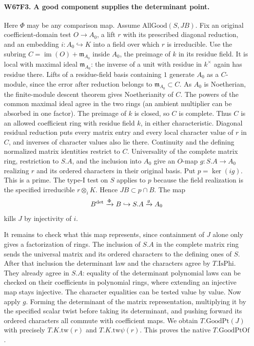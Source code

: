 \paragraph{W67F3. A good component supplies the determinant point.}
Here $\Phi$ may be any comparison map. Assume
$\mathrm{AllGood}(S,JB)$. Fix an original coefficient-domain
test $O\to A_0$, a lift $r$ with its prescribed diagonal reduction,
and an embedding $i:A_0\hookrightarrow K$ into a field over which
$r$ is irreducible. Use the subring
$C=\operatorname{im}(O)+\mathfrak m_{A_0}$ inside $A_0$, the
preimage of $k$ in its residue field. It is local with maximal ideal
$\mathfrak m_{A_0}$: the inverse of a unit with residue in
$k^\times$ again has residue there. Lifts of a residue-field basis
containing $1$ generate $A_0$ as a $C$-module, since the error
after reduction belongs to $\mathfrak m_{A_0}\subset C$.
As $A_0$ is Noetherian, the finite-module descent theorem gives
Noetherianity of $C$. The powers of the common maximal ideal agree
in the two rings (an ambient multiplier can be absorbed in one
factor). The preimage of $k$ is closed, so $C$ is complete.
Thus $C$ is an allowed coefficient ring with residue field $k$,
in either characteristic. Diagonal residual reduction puts every
matrix entry and every local character value of $r$ in $C$,
and inverses of character values also lie there. Continuity and
the defining normalized matrix identities restrict to $C$.
Universality of the complete matrix ring, restriction to $S.A$,
and the inclusion into $A_0$ give an $O$-map $g:S.A\to A_0$
realizing $r$ and its ordered characters in their original basis.
Put $p=\ker(i g)$. This is a prime. The type-I test
on $S$ applies to $p$ because the field realization is the
specified irreducible $r\otimes_i K$. Hence $JB\subset p\cap B$.
The map
\[
                B^{\rm det}\xrightarrow{\Phi}B
                          \hookrightarrow S.A\xrightarrow{g}A_0
\]
kills $J$ by injectivity of $i$.

It remains to check what this map represents, since containment
of $J$ alone only gives a factorization of rings. The inclusion
of $S.A$ in the complete matrix ring sends the universal matrix
and its ordered characters to the defining ones of $S$.
After that inclusion the determinant law and the characters agree
by $T.\mathrm{IsPhi}$. They already agree in $S.A$: equality of
the determinant polynomial laws can be checked on their coefficients
in polynomial rings, where extending an injective map stays
injective. The character equalities can be tested value by value.
Now apply $g$. Forming the determinant of the matrix representation,
multiplying it by the specified scalar twist before taking its
determinant, and pushing forward its ordered characters all commute
with coefficient maps. We obtain $T.\mathrm{GoodPt}(J)$ with
precisely $T.K.\mathrm{tw}(r)$ and $T.K.\mathrm{tw}\psi(r)$.
This proves the native $T.\mathrm{GoodPtOf}$.

